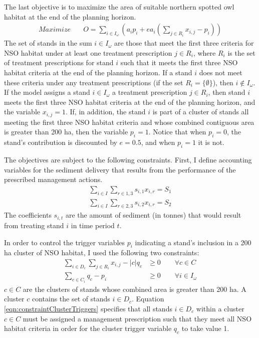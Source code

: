 The last objective is to maximize the area of suitable northern spotted owl habitat at the end of the planning horizon.
\begin{align}
Maximize \quad & O = \sum_{i\in I_\omega} \left(a_i p_i + e a_i \left( \sum_{j \in R_i} x_{i,j}-p_i \right) \right) \label{eqn:objOwl}
\end{align}
The set of stands in the sum $i \in I_\omega$ are those that meet the first three criteria for NSO habitat under at least one treatment prescription $j \in R_i$, where $R_i$ is the set of treatment prescriptions for stand $i$ such that it meets the first three NSO habitat criteria at the end of the planning horizon. If a stand $i$ does not meet these criteria under any treatment prescriptions (if the set $R_i = \{\emptyset\}$), then $i \notin I_\omega$. If the model assigns a stand $i \in I_\omega$ a treatment prescription $j \in R_i$, then stand $i$ meets the first three NSO habitat criteria at the end of the planning horizon, and the variable $x_{i,j}=1$. If, in addition, the stand $i$ is part of a cluster of stands all meeting the first three NSO habitat criteria and whose combined contiguous area is greater than 200 ha, then the variable $p_i = 1$. Notice that when $p_i = 0$, the stand's contribution is discounted by $e = 0.5$, and when $p_i = 1$ it is not.

The objectives are subject to the following constraints. First, I define accounting variables for the sediment delivery that results from the performance of the prescribed management actions.
\begin{align}
\sum_{i\in I} \sum_{r\in 1,3} s_{i,1} x_{i,r} = S_1 \label{eqn:constraintSediment1}\\
\sum_{i\in I} \sum_{r\in 2,3} s_{i,2} x_{i,r} = S_2 \label{eqn:constraintSediment2}
\end{align}
The coefficients $s_{i,t}$ are the amount of sediment (in tonnes) that would result from treating stand $i$ in time period $t$.

In order to control the trigger variables $p_i$ indicating a stand's inclusion in a 200 ha cluster of NSO habitat, I used the following two constraints:
\begin{align}
\sum_{i \in D_c} \sum_{j \in R_i} x_{i,j} - |c| q_c &\ge 0 \qquad \forall c \in C \label{eqn:constraintClusterTriggers}\\
\sum_{c \in C_i} q_c - p_i &\ge 0 \qquad \forall i \in I_\omega \label{eqn:constraintPVarTriggers}
\end{align}
$c \in C$ are the clusters of stands whose combined area is greater than 200 ha. A cluster $c$ contains the set of stands $i \in D_c$. Equation \eqref{eqn:constraintClusterTriggers} specifies that all stands $i \in D_c$ within a cluster $c \in C$ must be assigned a management prescription such that they meet all NSO habitat criteria in order for the cluster trigger variable $q_c$ to take value 1.

